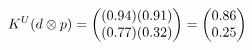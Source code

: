 \documentclass[preview]{standalone}
\begin{document}
\begin{align*}
\special{dvisvgm:raw <g id='unique000'>}K^U(d \otimes p) = \begin{pmatrix} (0.94)(0.91) \\ (0.77)(0.32) \end{pmatrix} = \begin{pmatrix} 0.86 \\ 0.25 \end{pmatrix}\special{dvisvgm:raw </g>}
\end{align*}
\end{document}
